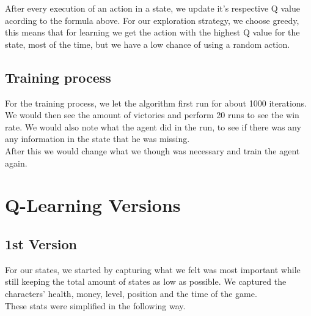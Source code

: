 \documentclass{article}
\begin{document}
  After every execution of an action in a state, we update it's respective Q value acording to the formula above. 
  For our exploration strategy, we choose greedy, this means that for learning we get the action with the highest Q value for
  the state, most of the time, but we have a low chance of using a random action.\\
  
  \subsection{Training process}
  For the training process, we let the algorithm first run for about 1000 iterations.
  We would then see the amount of victories and perform 20 runs to see the win rate.
  We would also note what the agent did in the run, to see if there was any any information
  in the state that he was missing.\\
  After this we would change what we though was necessary and train the agent again.

  \section{Q-Learning Versions}
  \subsection{1st Version}
  For our states, we started by capturing what we felt was most important while still keeping the total amount of states as low as possible.
  We captured the characters' health, money, level, position and the time of the game.\\
  These stats were simplified in the following way.\\
\end{document}
